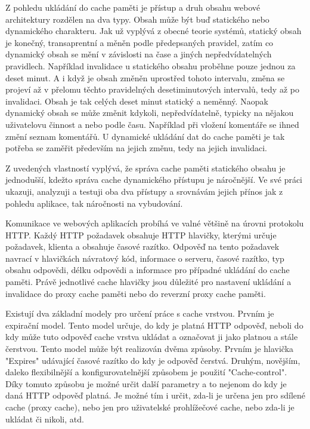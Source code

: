 \documentclass[12pt]{article}
\begin{document}
\obrazek
{}

Z pohledu ukládání do cache paměti je přístup a druh obsahu webové architektury rozdělen na dva typy. Obsah může být buď statického nebo dynamického charakteru. Jak už vyplývá z obecné teorie systémů, statický obsah je konečný, transaprentní a měněn podle předepsaných pravidel, zatím co dynamický obsah se mění v závislosti na čase a jiných nepředvídatelných pravidlech. Například invalidace u statického obsahu proběhne pouze jednou za deset minut. A i když je obsah změněn uprostřed tohoto intervalu, změna se projeví až v přelomu těchto pravidelných desetiminutových intervalů, tedy až po invalidaci. Obsah je tak celých deset minut statický a neměnný. Naopak dynamický obsah se může změnit kdykoli, nepředvídatelně, typicky na nějakou uživatelovu činnost a nebo podle času. Například při vložení komentáře se ihned změní seznam komentářů. U dynamické ukládání dat do cache paměti je tak potřeba se zaměřit především na jejich změnu, tedy na jejich invalidaci.

Z uvedených vlastností vyplývá, že správa cache paměti statického obsahu je jednodušší, kdežto správa cache dynamického přístupu je náročnější. Ve své práci ukazuji, analyzuji a testuji oba dva přístupy a srovnávám jejich přínos jak z pohledu aplikace, tak náročnosti na vybudování.

Komunikace ve webových aplikacích probíhá ve valné většině na úrovni protokolu HTTP. Každý HTTP požadavek obsahuje HTTP hlavičky, kterými určuje požadavek, klienta a obsahuje časové razítko. Odpověď na tento požadavek navrací v hlavičkách návratový kód, informace o serveru, časové razítko, typ obsahu odpovědi, délku odpovědi a informace pro případné ukládání do cache paměti. Právě jednotlivé cache hlavičky jsou důležité pro nastavení ukládání a invalidace do proxy cache paměti nebo do reverzní proxy cache paměti.

Existují dva základní modely pro určení práce s cache vrstvou. Prvním je expirační model. Tento model určuje, do kdy je platná HTTP odpověď, neboli do kdy může tuto odpověď cache vrstva ukládat a označovat ji jako platnou a stále čerstvou. Tento model může být realizován dvěma způsoby. Prvním je hlavička "Expires" udávající časové razítko do kdy je odpověď čerstvá. Druhým, novějším, daleko flexibilnější a konfigurovatelnější způsobem je použití "Cache-control". Díky tomuto způsobu je možné určit další parametry a to nejenom do kdy je daná HTTP odpověď platná. Je možné tím i určit, zda-li je určena jen pro sdílené cache (proxy cache), nebo jen pro uživatelské prohlížečové cache, nebo zda-li je ukládat či nikoli, atd.\cite{rfc-http}
\end{document}
